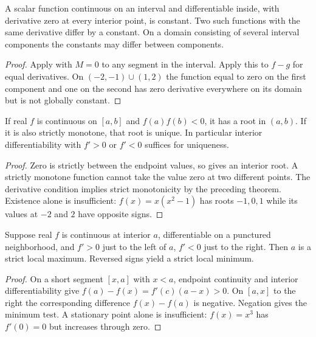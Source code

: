 \begin{corollary}
A scalar function continuous on an interval and differentiable inside, with derivative zero at every interior point, is constant. Two such functions with the same derivative differ by a constant. On a domain consisting of several interval components the constants may differ between components.
\end{corollary}
\begin{proof}
Apply  with $M=0$ to any segment in the interval. Apply this to $f-g$ for equal derivatives. On $(-2,-1)\cup(1,2)$ the function equal to zero on the first component and one on the second has zero derivative everywhere on its domain but is not globally constant.
\end{proof}

\begin{proposition}
If real $f$ is continuous on $[a,b]$ and $f(a)f(b)<0$, it has a root in $(a,b)$. If it is also strictly monotone, that root is unique. In particular interior differentiability with $f'>0$ or $f'<0$ suffices for uniqueness.
\end{proposition}
\begin{proof}
Zero is strictly between the endpoint values, so  gives an interior root. A strictly monotone function cannot take the value zero at two different points. The derivative condition implies strict monotonicity by the preceding theorem. Existence alone is insufficient: $f(x)=x(x^2-1)$ has roots $-1,0,1$ while its values at $-2$ and $2$ have opposite signs.
\end{proof}

\begin{proposition}
Suppose real $f$ is continuous at interior $a$, differentiable on a punctured neighborhood, and $f'>0$ just to the left of $a$, $f'<0$ just to the right. Then $a$ is a strict local maximum. Reversed signs yield a strict local minimum.
\end{proposition}
\begin{proof}
On a short segment $[x,a]$ with $x<a$, endpoint continuity and interior differentiability give $f(a)-f(x)=f'(c)(a-x)>0$. On $[a,x]$ to the right the corresponding difference $f(x)-f(a)$ is negative. Negation gives the minimum test. A stationary point alone is insufficient: $f(x)=x^3$ has $f'(0)=0$ but increases through zero.
\end{proof}

